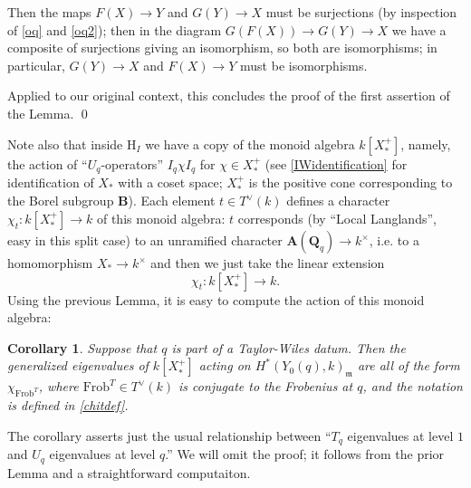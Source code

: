 \documentclass[10pt]{amsart}
\newcommand{\Frob}{\mathrm{Frob}}
\newcommand{\Q}{\mathbf{Q}}
\newtheorem{corollary}[subsection]{Corollary}
\theoremstyle{remark}
\begin{document}
 

Then the maps $F(X) \rightarrow Y$ and $G(Y) \rightarrow X$ must be  surjections
(by inspection of \eqref{oq} and  \eqref{oq2}); then in the diagram
$ G(F(X)) \rightarrow G(Y) \rightarrow X$
we have a composite of surjections giving an isomorphism,  so both are isomorphisms; in particular,
$G(Y) \rightarrow X$ and $F(X) \rightarrow Y$ must be isomorphisms.    

Applied to our original context, this concludes the proof of the first assertion of the Lemma.
\qed 

\medskip

 
 Note also that inside $\mathrm{H}_I$ we have a copy of the monoid algebra  
 $k[X_*^+]$, namely, the action of ``$U_{q}$-operators'' $I_q \chi I_q$
 for $\chi \in X_*^+$ (see \eqref{IWidentification} for identification of $X_*$ with a coset space; $X_*^+$
 is the positive cone corresponding to the Borel subgroup $\mathbf{B}$). 
 Each element $t \in T^{\vee}(k)$ defines a character  $\chi_t: k[X_*^+] \rightarrow k$ of this monoid algebra: 
 $t$ corresponds 
  (by ``Local Langlands'', easy in this split case)
 to an unramified character $\mathbf{A}(\Q_{q}) \rightarrow k^{\times}$, i.e. to a homomorphism $X_* \rightarrow k^{\times}$
 and then we just take the linear extension
\begin{equation} \label{chitdef} \chi_{t}: k[X_*^+] \rightarrow k.\end{equation}   
 Using the  previous Lemma, it is easy to compute the action of this monoid algebra:
  \begin{corollary} \label{MoritaCor}   
  Suppose that $q$ is part of a Taylor-Wiles datum. Then  the generalized  eigenvalues of $k[X_*^+]$ acting on $H^*(Y_0(q), k)_{\mathfrak{m}}$
are all of the  form $\chi_{\Frob^T}$, \index{$\chi_{\Frob^T}$}
where    $\Frob^T \in T^{\vee}(k)$ is conjugate to the Frobenius at $q$, and the notation is defined in \eqref{chitdef}. 
\end{corollary} 
The corollary asserts just the usual 
 relationship between ``$T_{q}$ eigenvalues at level $1$ and $U_{q}$ eigenvalues at level $q$.''  We will omit the proof; it follows
 from the prior Lemma and a straightforward computaiton.
\end{document}
